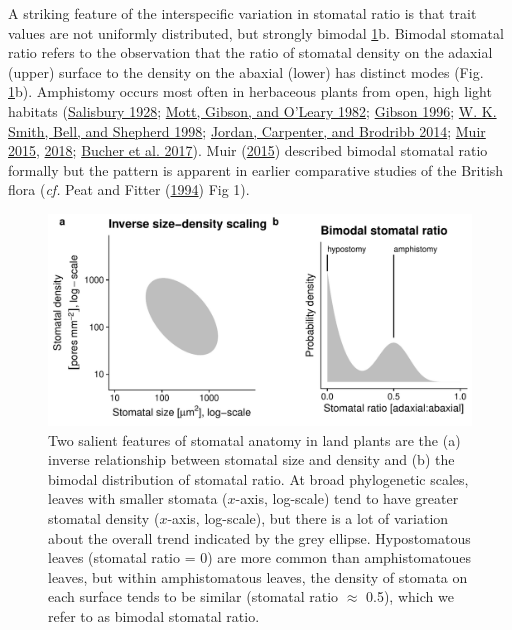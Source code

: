 \documentclass[
  12pt,
]{article}
\begin{document}
A striking feature of the interspecific variation in stomatal ratio is that trait values are not uniformly distributed, but strongly bimodal \ref{fig:concepts}b. Bimodal stomatal ratio refers to the observation that the ratio of stomatal density on the adaxial (upper) surface to the density on the abaxial (lower) has distinct modes (Fig. \ref{fig:concepts}b). Amphistomy occurs most often in herbaceous plants from open, high light habitats (\protect\hyperlink{ref-salisbury_i_1928}{Salisbury 1928}; \protect\hyperlink{ref-mott_adaptive_1982}{Mott, Gibson, and O'Leary 1982}; \protect\hyperlink{ref-gibson_structure-function_1996}{Gibson 1996}; \protect\hyperlink{ref-smith_associations_1998}{W. K. Smith, Bell, and Shepherd 1998}; \protect\hyperlink{ref-jordan_using_2014}{Jordan, Carpenter, and Brodribb 2014}; \protect\hyperlink{ref-muir_making_2015}{Muir 2015}, \protect\hyperlink{ref-muir_light_2018}{2018}; \protect\hyperlink{ref-bucher_stomatal_2017}{Bucher et al. 2017}). Muir (\protect\hyperlink{ref-muir_making_2015}{2015}) described bimodal stomatal ratio formally but the pattern is apparent in earlier comparative studies of the British flora (\emph{cf.} Peat and Fitter (\protect\hyperlink{ref-peat_comparative_1994}{1994}) Fig 1).

\begin{figure}[ht]
\includegraphics[width=\textwidth]{../figures/concepts.pdf}
\caption{Two salient features of stomatal anatomy in land plants are the (a) inverse relationship between stomatal size and density and (b) the bimodal distribution of stomatal ratio. At broad phylogenetic scales, leaves with smaller stomata ($x$-axis, log-scale) tend to have greater stomatal density  ($x$-axis, log-scale), but there is a lot of variation about the overall trend indicated by the grey ellipse. Hypostomatous leaves (stomatal ratio = 0) are more common than amphistomatoues leaves, but within amphistomatous leaves, the density of stomata on each surface tends to be similar (stomatal ratio $\approx$ 0.5), which we refer to as bimodal stomatal ratio.}
\label{fig:concepts}
\end{figure}
\end{document}
